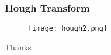 \documentclass[notheorems,serif,table,compress]{beamer}  %
\begin{document}
\begin{frame}
\frametitle{Hough Transform}
    \begin{figure}
    \texttt{[image: hough2.png]} 
    \end{figure}
\end{frame}

\begin{frame}
  \vspace{2cm}
  \centering
  \Huge{Thanks}\\
  \vspace{1.5cm}
 

\end{frame}
\end{document}
